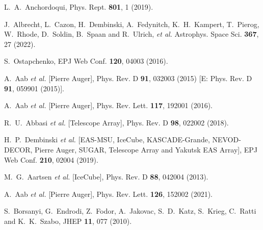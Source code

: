 \documentclass[aps,twocolumn,nofootinbib]{revtex4-1}
\begin{document}
\begin{thebibliography}{}
L.~A.~Anchordoqui,
Phys. Rept. \textbf{801}, 1 (2019).

J.~Albrecht, L.~Cazon, H.~Dembinski, A.~Fedynitch, K.~H.~Kampert, T.~Pierog, W.~Rhode, D.~Soldin, B.~Spaan and R.~Ulrich, \textit{et al.}
Astrophys. Space Sci. \textbf{367}, 27 (2022).

S.~Ostapchenko,
EPJ Web Conf. \textbf{120}, 04003 (2016).

A.~Aab \textit{et al.} [Pierre Auger],
Phys. Rev. D \textbf{91}, 032003 (2015)
[E: Phys. Rev. D \textbf{91}, 059901 (2015)].

A.~Aab \textit{et al.} [Pierre Auger],
Phys. Rev. Lett. \textbf{117}, 192001 (2016).

R.~U.~Abbasi \textit{et al.} [Telescope Array],
Phys. Rev. D \textbf{98}, 022002 (2018).

H.~P.~Dembinski \textit{et al.} [EAS-MSU, IceCube, KASCADE-Grande, NEVOD-DECOR, Pierre Auger, SUGAR, Telescope Array and Yakutsk EAS Array],
EPJ Web Conf. \textbf{210}, 02004 (2019).

M.~G.~Aartsen \textit{et al.} [IceCube],
Phys. Rev. D \textbf{88}, 042004 (2013).

A.~Aab \textit{et al.} [Pierre Auger],
Phys. Rev. Lett. \textbf{126}, 152002 (2021).

S.~Borsanyi, G.~Endrodi, Z.~Fodor, A.~Jakovac, S.~D.~Katz, S.~Krieg, C.~Ratti and K.~K.~Szabo,
JHEP \textbf{11}, 077 (2010).


\end{thebibliography}
\end{document}
